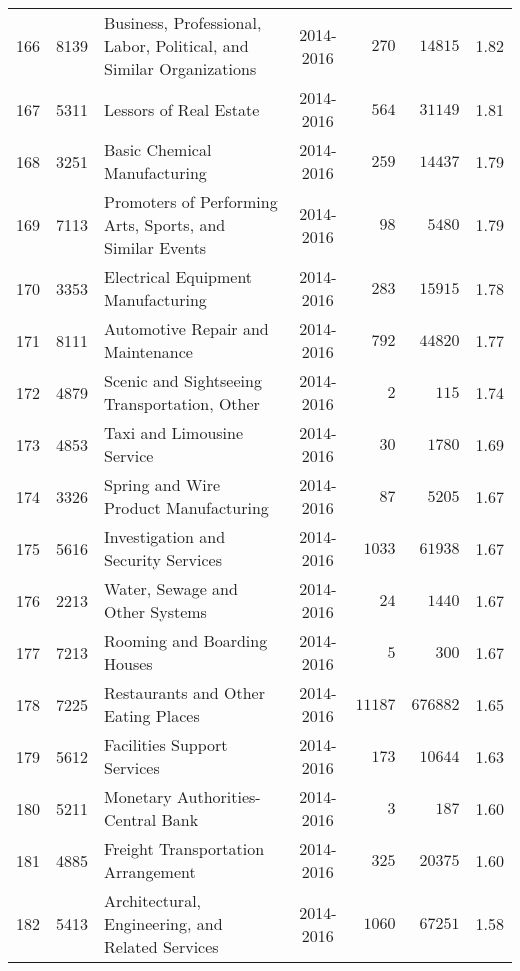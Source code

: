 \documentclass[9pt, oneside]{article}   	%
\begin{document}
\begin{longtable}{lcp{3in}cccc}
166  & 8139 & Business, Professional, Labor, Political, and Similar Organizations & 2014-2016 & $\phantom{00}270$ & $\phantom{0}14815$ &  1.82 \\
167  & 5311 & Lessors of Real Estate & 2014-2016 & $\phantom{00}564$ & $\phantom{0}31149$ &  1.81 \\
168  & 3251 & Basic Chemical Manufacturing & 2014-2016 & $\phantom{00}259$ & $\phantom{0}14437$ &  1.79 \\
169  & 7113 & Promoters of Performing Arts, Sports, and Similar Events & 2014-2016 & $\phantom{000}98$ & $\phantom{00}5480$ &  1.79 \\
170  & 3353 & Electrical Equipment Manufacturing & 2014-2016 & $\phantom{00}283$ & $\phantom{0}15915$ &  1.78 \\
171  & 8111 & Automotive Repair and Maintenance & 2014-2016 & $\phantom{00}792$ & $\phantom{0}44820$ &  1.77 \\
172  & 4879 & Scenic and Sightseeing Transportation, Other & 2014-2016 & $\phantom{0000}2$ & $\phantom{000}115$ &  1.74 \\
173  & 4853 & Taxi and Limousine Service & 2014-2016 & $\phantom{000}30$ & $\phantom{00}1780$ &  1.69 \\
174  & 3326 & Spring and Wire Product Manufacturing & 2014-2016 & $\phantom{000}87$ & $\phantom{00}5205$ &  1.67 \\
175  & 5616 & Investigation and Security Services & 2014-2016 & $\phantom{0}1033$ & $\phantom{0}61938$ &  1.67 \\
176  & 2213 & Water, Sewage and Other Systems & 2014-2016 & $\phantom{000}24$ & $\phantom{00}1440$ &  1.67 \\
177  & 7213 & Rooming and Boarding Houses & 2014-2016 & $\phantom{0000}5$ & $\phantom{000}300$ &  1.67 \\
178  & 7225 & Restaurants and Other Eating Places & 2014-2016 & $11187$ & $676882$ &  1.65 \\
179  & 5612 & Facilities Support Services & 2014-2016 & $\phantom{00}173$ & $\phantom{0}10644$ &  1.63 \\
180  & 5211 & Monetary Authorities-Central Bank & 2014-2016 & $\phantom{0000}3$ & $\phantom{000}187$ &  1.60 \\
181  & 4885 & Freight Transportation Arrangement & 2014-2016 & $\phantom{00}325$ & $\phantom{0}20375$ &  1.60 \\
182  & 5413 & Architectural, Engineering, and Related Services & 2014-2016 & $\phantom{0}1060$ & $\phantom{0}67251$ &  1.58 \\

\end{longtable}
\end{document}
